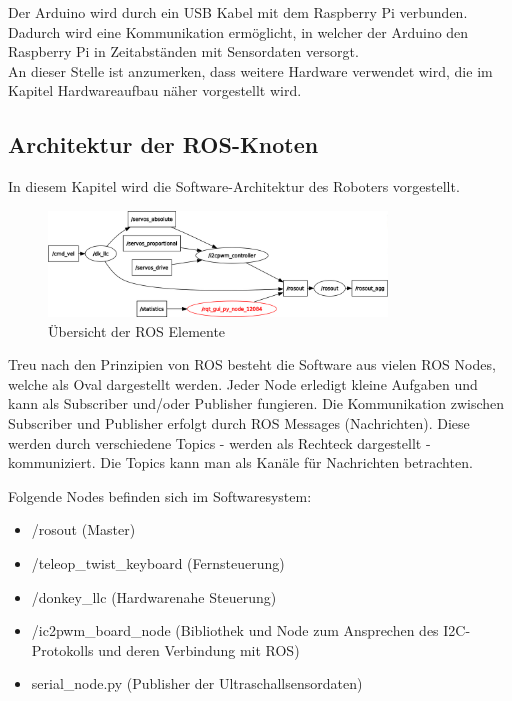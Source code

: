 \documentclass[conference]{IEEEtran}
\begin{document}
	Der Arduino wird durch ein USB Kabel mit dem Raspberry Pi verbunden.
	Dadurch wird eine Kommunikation ermöglicht, in welcher der Arduino den Raspberry Pi in Zeitabständen mit Sensordaten versorgt.
	\\
	An dieser Stelle ist anzumerken, dass weitere Hardware verwendet wird, die im Kapitel Hardwareaufbau näher vorgestellt wird.
	
	\subsection{Architektur der ROS-Knoten}\label{sec:Architektur}
	
	In diesem Kapitel wird die Software-Architektur des Roboters vorgestellt.
	
	\begin{figure}[!ht] 
		\centering
		\includegraphics[width=9cm]{img/rosgraph.png}
		\caption{Übersicht der ROS Elemente}
		\label{rosgraph}
	\end{figure}
	
	Treu nach den Prinzipien von ROS besteht die Software aus vielen ROS Nodes, welche als Oval dargestellt werden. 
	Jeder Node erledigt kleine Aufgaben und kann als Subscriber und/oder Publisher fungieren.
	Die Kommunikation zwischen Subscriber und Publisher erfolgt durch ROS Messages (Nachrichten).
	Diese werden durch verschiedene Topics - werden als Rechteck dargestellt - kommuniziert.
	Die Topics kann man als Kanäle für Nachrichten betrachten.
	
	Folgende Nodes befinden sich im Softwaresystem:
	\begin{itemize}
		\item /rosout (Master)
		\item /teleop\_twist\_keyboard (Fernsteuerung)
		\item /donkey\_llc (Hardwarenahe Steuerung)
		\item /ic2pwm\_board\_node (Bibliothek und Node zum Ansprechen des I2C-Protokolls und deren Verbindung mit ROS)
		\item serial\_node.py (Publisher der Ultraschallsensordaten)
	\end{itemize}
	
\end{document}
